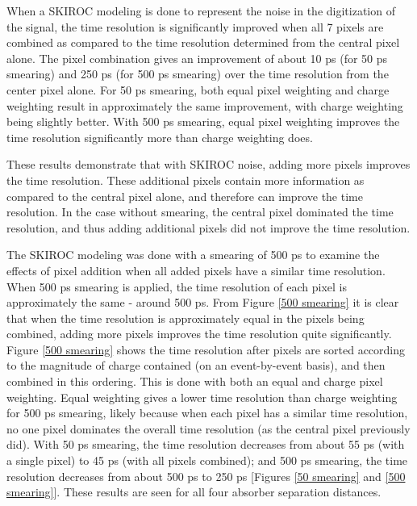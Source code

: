 \documentclass[twocolumn,aps,prd,reprint]{revtex4-1}
\begin{document}
When a SKIROC modeling is done to represent the noise in the digitization of the signal, the time resolution is significantly improved when all 7 pixels are combined as compared to the time resolution determined from the central pixel alone. The pixel combination gives an improvement of about 10 ps (for 50 ps smearing) and 250 ps (for 500 ps smearing) over the time resolution from the center pixel alone. For 50 ps smearing, both equal pixel weighting and charge weighting result in approximately the same improvement, with charge weighting being slightly better. With 500 ps smearing, equal pixel weighting improves the time resolution significantly more than charge weighting does.

These results demonstrate that with SKIROC noise, adding more pixels improves the time resolution. These additional pixels contain more information as compared to the central pixel alone, and therefore can improve the time resolution. In the case without smearing, the central pixel dominated the time resolution, and thus adding additional pixels did not improve the time resolution. 

The SKIROC modeling was done with a smearing of 500 ps to examine the effects of pixel addition when all added pixels have a similar time resolution. When 500 ps smearing is applied, the time resolution of each pixel is approximately the same - around 500 ps. From Figure \ref{500 smearing} it is clear that when the time resolution is approximately equal in the pixels being combined, adding more pixels improves the time resolution quite significantly. Figure \ref{500 smearing} shows the time resolution after pixels are sorted according to the magnitude of charge contained (on an event-by-event basis), and then combined in this ordering. This is done with both an equal and charge pixel weighting. Equal weighting gives a lower time resolution than charge weighting for 500 ps smearing, likely because when each pixel has a similar time resolution, no one pixel dominates the overall time resolution (as the central pixel previously did). With 50 ps smearing, the time resolution decreases from about 55 ps (with a single pixel) to 45 ps (with all pixels combined); and 500 ps smearing, the time resolution decreases from about 500 ps to 250 ps [Figures \ref{50 smearing} and \ref{500 smearing}]. These results are seen for all four absorber separation distances.
\end{document}

